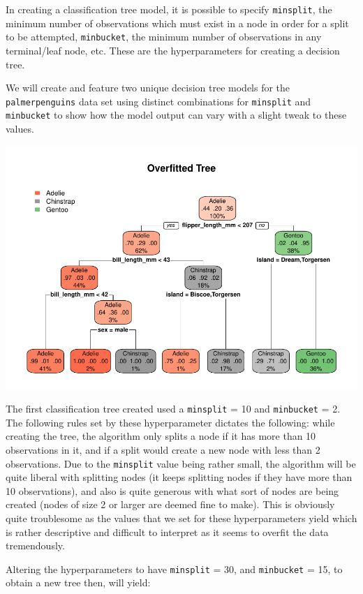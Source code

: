 \documentclass[12pt]{article}
\begin{document}
In creating a classification tree model, it is possible to specify
\texttt{minsplit}, the minimum number of observations which must exist
in a node in order for a split to be attempted, \texttt{minbucket}, the
minimum number of observations in any terminal/leaf node, etc. These are
the hyperparameters for creating a decision tree.

We will create and feature two unique decision tree models for the
\texttt{palmerpenguins} data set using distinct combinations for
\texttt{minsplit} and \texttt{minbucket} to show how the model output
can vary with a slight tweak to these values.

\includegraphics{deid_files/figure-latex/tree1.1-1.pdf}

The first classification tree created used a \texttt{minsplit} = 10 and
\texttt{minbucket} = 2. The following rules set by these hyperparameter
dictates the following: while creating the tree, the algorithm only
splits a node if it has more than 10 observations in it, and if a split
would create a new node with less than 2 observations. Due to the
\texttt{minsplit} value being rather small, the algorithm will be quite
liberal with splitting nodes (it keeps splitting nodes if they have more
than 10 observations), and also is quite generous with what sort of
nodes are being created (nodes of size 2 or larger are deemed fine to
make). This is obviously quite troublesome as the values that we set for
these hyperparameters yield which is rather descriptive and difficult to
interpret as it seems to overfit the data tremendously.

Altering the hyperparameters to have \texttt{minsplit} = 30, and
\texttt{minbucket} = 15, to obtain a new tree then, will yield:
\end{document}
